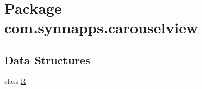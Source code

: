 \hypertarget{namespacecom_1_1synnapps_1_1carouselview}{}\section{Package com.\+synnapps.\+carouselview}
\label{namespacecom_1_1synnapps_1_1carouselview}
\subsection*{Data Structures}
\begin{DoxyCompactItemize}
\item 
class \mbox{\hyperlink{classcom_1_1synnapps_1_1carouselview_1_1_r}{R}}
\end{DoxyCompactItemize}
